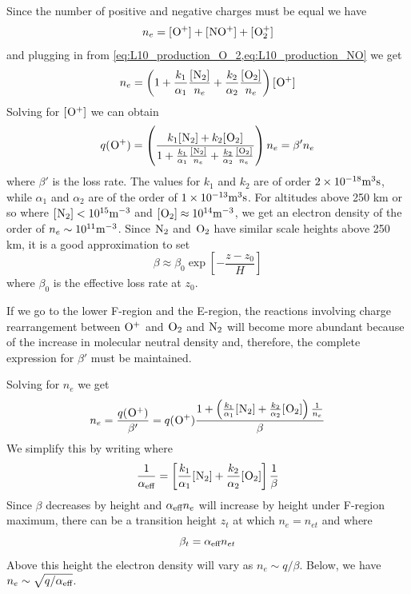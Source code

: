 Since the number of positive and negative charges must be equal we have
\begin{equation*}
    n_e=[\prescript{}{}{\textnormal{O}}^+]+[\prescript{}{}{\textnormal{NO}}^+]+[\prescript{}{}{\textnormal{O}}_2^+]
\end{equation*}
and plugging in from \cref{eq:L10_production_O_2,eq:L10_production_NO} we get
\begin{equation*}
    n_e=\left(1+\frac{k_1}{\alpha_1}\frac{[\prescript{}{}{\textnormal{N}}_2]}{n_e}+\frac{k_2}{\alpha_2}\frac{[\prescript{}{}{\textnormal{O}}_2]}{n_e}\right)[\prescript{}{}{\textnormal{O}}^+]
\end{equation*}
Solving for \([\prescript{}{}{\textnormal{O}}^+]\) we can obtain
\begin{equation*}
    q(\prescript{}{}{\textnormal{O}}^+)=\left(\frac{k_1[\prescript{}{}{\textnormal{N}}_2]+k_2[\prescript{}{}{\textnormal{O}}_2]}{1+\frac{k_1}{\alpha_1}\frac{[\prescript{}{}{\textnormal{N}}_2]}{n_e}+\frac{k_2}{\alpha_2}\frac{[\prescript{}{}{\textnormal{O}}_2]}{n_e}}\right)n_e=\beta'n_e
\end{equation*}
where \(\beta'\) is the loss rate. The values for \(k_1\) and \(k_2\) are of order \(\num{2e-18}\textnormal{m}^3\textnormal{s}\), while \(\alpha_1\) and \(\alpha_2\) are of the order of \(\num{1e-13}\textnormal{m}^3\textnormal{s}\). For altitudes above 250 km or so where \([\prescript{}{}{\textnormal{N}}_2]<10^{15}\textnormal{m}^{-3}\) and \([\prescript{}{}{\textnormal{O}}_2]\approx 10^{14}\textnormal{m}^{-3}\), we get an electron density of the order of \(n_e\sim 10^{11}\textnormal{m}^{-3}\). Since \(\prescript{}{}{\textnormal{N}}_2\) and \(\prescript{}{}{\textnormal{O}}_2\) have similar scale heights above 250 km, it is a good approximation to set
\begin{equation}
    \beta\approx\beta_0\exp\left[-\frac{z-z_0}{H}\right]
\end{equation}
where \(\beta_0\) is the effective loss rate at \(z_0\).

If we go to the lower F-region and the E-region, the reactions involving charge rearrangement between \(\prescript{}{}{\textnormal{O}}^+\) and \(\prescript{}{}{\textnormal{O}}_2\) and \(\prescript{}{}{\textnormal{N}}_2\) will become more abundant because of the increase in molecular neutral
density and, therefore, the complete expression for \(\beta'\) must be maintained.

Solving for \(n_e\) we get
\begin{equation*}
    n_e=\frac{q(\prescript{}{}{\textnormal{O}}^+)}{\beta'}=q(\prescript{}{}{\textnormal{O}}^+)\frac{1+\left(\frac{k_1}{\alpha_1}[\prescript{}{}{\textnormal{N}}_2]+\frac{k_2}{\alpha_2}[\prescript{}{}{\textnormal{O}}_2]\right)\frac{1}{n_e}}{\beta}
\end{equation*}
We simplify this by writing
where
\begin{equation*}
    \frac{1}{\alpha_{\textnormal{eff}}}=\left[\frac{k_1}{\alpha_1}[\prescript{}{}{\textnormal{N}}_2]+\frac{k_2}{\alpha_2}[\prescript{}{}{\textnormal{O}}_2]\right]\frac{1}{\beta}
\end{equation*}
Since \(\beta \) decreases by height and \(\alpha_{\textnormal{eff}}n_e\) will increase by height under F-region maximum, there can be a transition height \(z_t\) at which \(n_e=n_{et}\) and where
\begin{equation*}
    \beta_t=\alpha_{\textnormal{eff}}n_{et}
\end{equation*}
Above this height the electron density will vary as \(n_e\sim q/\beta \). Below, we have \(n_e\sim\sqrt{q/\alpha_{\textnormal{eff}}}\).


